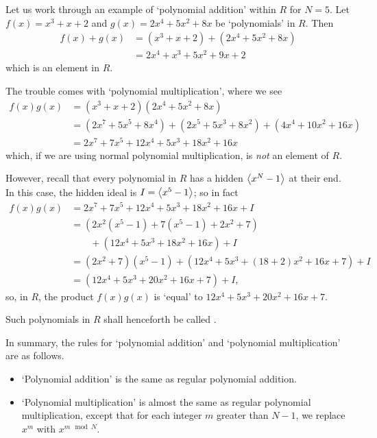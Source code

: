 \begin{example}
    Let us work through an example of `polynomial addition' within $R$ for $N = 5$. Let $f(x) = x^3 + x + 2$ and $g(x) = 2x^4 + 5x^2 + 8x$ be `polynomials' in $R$. Then
    \begin{align*}
        f(x) + g(x) &= (x^3 + x + 2) + (2x^4 + 5x^2 + 8x)\\
        &= 2x^4 + x^3 + 5x^2 + 9x + 2
    \end{align*}
    which is an element in $R$.

    The trouble comes with `polynomial multiplication', where we see
    \begin{align*}
        f(x)g(x) &= (x^3 + x + 2)(2x^4 + 5x^2 + 8x)\\
        &= (2x^7 + 5x^5 + 8x^4) + (2x^5 + 5x^3 + 8x^2) + (4x^4 + 10x^2 + 16x)\\
        &= 2x^7 + 7x^5 + 12x^4 + 5x^3 + 18x^2 + 16x
    \end{align*}
    which, if we are using normal polynomial multiplication, is \textit{not} an element of $R$.

    However, recall that every polynomial in $R$ has a hidden $\left\langle x^N - 1\right\rangle$ at their end. In this case, the hidden ideal is $I = \left\langle x^5-1\right\rangle$; so in fact
    \begin{align*}
        f(x)g(x) &= 2x^7 + 7x^5 + 12x^4 + 5x^3 + 18x^2 + 16x + I\\
        &= (2x^2(x^5-1) + 7(x^5-1) + 2x^2 + 7)\\
        &\quad\quad+ (12x^4 + 5x^3 + 18x^2 + 16x) + I\\
        &= (2x^2+7)(x^5-1) + (12x^4 + 5x^3 + (18 + 2)x^2 + 16x + 7) + I\\
        &= (12x^4 + 5x^3 + 20x^2 + 16x + 7) + I,
    \end{align*}
    so, in $R$, the product $f(x)g(x)$ is `equal' to $12x^4 + 5x^3 + 20x^2 + 16x + 7$.
\end{example}

Such polynomials in $R$ shall henceforth be called .

In summary, the rules for `polynomial addition' and `polynomial multiplication' are as follows.
\begin{itemize}
    \item `Polynomial addition' is the same as regular polynomial addition.
    \item `Polynomial multiplication' is almost the same as regular polynomial multiplication, except that for each integer $m$ greater than $N - 1$, we replace $x^m$ with $x^{m \mod N}$.
\end{itemize}

